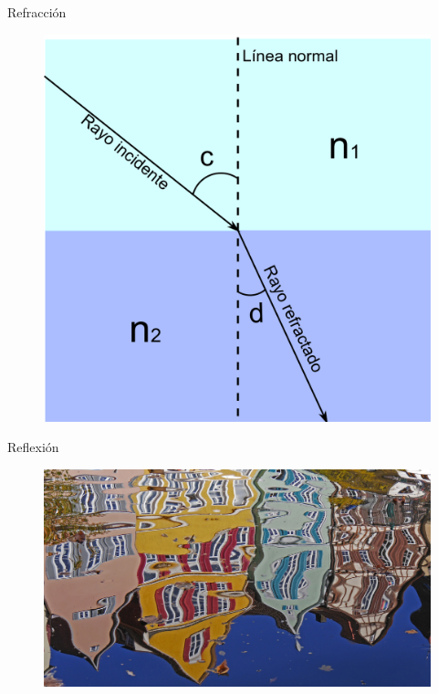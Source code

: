 \documentclass{beamer}
\begin{document}
\begin{frame}{Refracción}
 \begin{figure}
   \centering
   \includegraphics[scale=0.18]{Imagenes/Refraccion_01}
  \end{figure}
\end{frame}

\begin{frame}{Reflexión}
 \begin{figure}
   \centering
   \includegraphics[scale=0.08]{Imagenes/Reflexion_02}
  \end{figure}
\end{frame}
\end{document}

